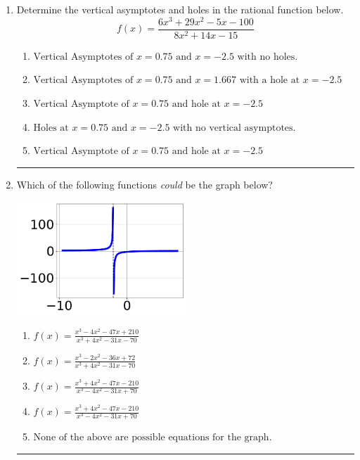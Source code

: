 \documentclass[14pt]{extbook}
\newcommand{\litem}[1]{\item#1\hspace*{-1cm}\rule{\textwidth}{0.4pt}}
\begin{document}
\begin{enumerate}
{\begin{enumerate}[label=\Alph*.]
\end{enumerate} }
\litem{
Determine the vertical asymptotes and holes in the rational function below.\[ f(x) = \frac{6x^{3} +29 x^{2} -5 x -100}{8x^{2} +14 x -15} \]\begin{enumerate}[label=\Alph*.]
\item \( \text{Vertical Asymptotes of } x = 0.75 \text{ and } x = -2.5 \text{ with no holes.} \)
\item \( \text{Vertical Asymptotes of } x = 0.75 \text{ and } x = 1.667 \text{ with a hole at } x = -2.5 \)
\item \( \text{Vertical Asymptote of } x = 0.75 \text{ and hole at } x = -2.5 \)
\item \( \text{Holes at } x = 0.75 \text{ and } x = -2.5 \text{ with no vertical asymptotes.} \)
\item \( \text{Vertical Asymptote of } x = 0.75 \text{ and hole at } x = -2.5 \)

\end{enumerate} }
\litem{
Which of the following functions \textit{could} be the graph below?
\begin{center}
    \includegraphics[width=0.5\textwidth]{../Figures/identifyGraphOfRationalFunctionCopyC.png}
\end{center}
\begin{enumerate}[label=\Alph*.]
\item \( f(x)=\frac{x^{3} -4 x^{2} -47 x + 210}{x^{3} +4 x^{2} -31 x -70} \)
\item \( f(x)=\frac{x^{3} -2 x^{2} -36 x + 72}{x^{3} +4 x^{2} -31 x -70} \)
\item \( f(x)=\frac{x^{3} +4 x^{2} -47 x -210}{x^{3} -4 x^{2} -31 x + 70} \)
\item \( f(x)=\frac{x^{3} +4 x^{2} -47 x -210}{x^{3} -4 x^{2} -31 x + 70} \)
\item \( \text{None of the above are possible equations for the graph.} \)


\end{enumerate}}
\end{enumerate}
\end{document}

